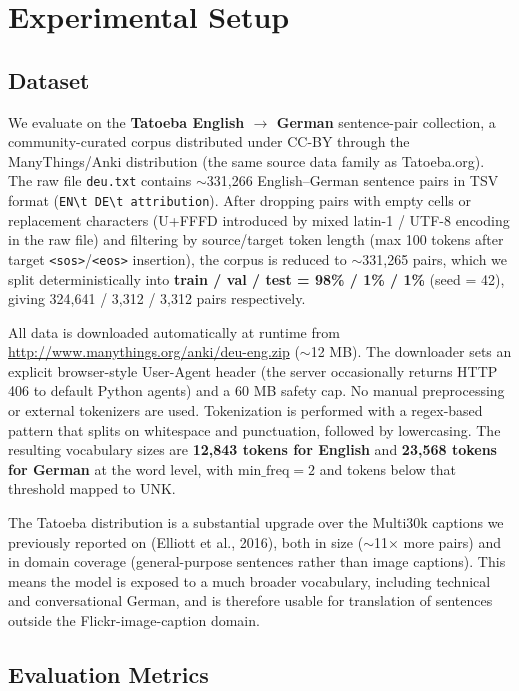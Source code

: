 \section{Experimental Setup}

\subsection{Dataset}

We evaluate on the \textbf{Tatoeba English $\rightarrow$ German} sentence-pair collection, a community-curated corpus distributed under CC-BY through the ManyThings/Anki distribution (the same source data family as Tatoeba.org). The raw file \texttt{deu.txt} contains $\sim$331,266 English--German sentence pairs in TSV format (\texttt{EN\textbackslash t DE\textbackslash t attribution}). After dropping pairs with empty cells or replacement characters (U+FFFD introduced by mixed latin-1 / UTF-8 encoding in the raw file) and filtering by source/target token length (max 100 tokens after target \texttt{<sos>}/\texttt{<eos>} insertion), the corpus is reduced to $\sim$331,265 pairs, which we split deterministically into \textbf{train / val / test = 98\% / 1\% / 1\%} (seed = 42), giving 324,641 / 3,312 / 3,312 pairs respectively.

All data is downloaded automatically at runtime from \url{http://www.manythings.org/anki/deu-eng.zip} ($\sim$12 MB). The downloader sets an explicit browser-style User-Agent header (the server occasionally returns HTTP 406 to default Python agents) and a 60 MB safety cap. No manual preprocessing or external tokenizers are used. Tokenization is performed with a regex-based pattern that splits on whitespace and punctuation, followed by lowercasing. The resulting vocabulary sizes are \textbf{12,843 tokens for English} and \textbf{23,568 tokens for German} at the word level, with $\text{min\_freq} = 2$ and tokens below that threshold mapped to UNK.

The Tatoeba distribution is a substantial upgrade over the Multi30k captions we previously reported on (Elliott et al., 2016), both in size ($\sim$11$\times$ more pairs) and in domain coverage (general-purpose sentences rather than image captions). This means the model is exposed to a much broader vocabulary, including technical and conversational German, and is therefore usable for translation of sentences outside the Flickr-image-caption domain.

\subsection{Evaluation Metrics}

